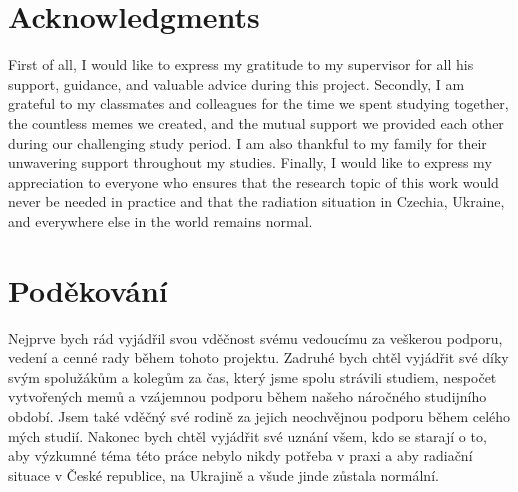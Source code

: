 
\section*{Acknowledgments}
First of all, I would like to express my gratitude to my supervisor for all his support, guidance, and valuable advice during this project.
Secondly, I am grateful to my classmates and colleagues for the time we spent studying together, the countless memes we created, and the mutual support we provided each other during our challenging study period.
I am also thankful to my family for their unwavering support throughout my studies.
Finally, I would like to express my appreciation to everyone who ensures that the research topic of this work would never be needed in practice and that the radiation situation in Czechia, Ukraine, and everywhere else in the world remains normal.

\vspace{2.5cm}








\section*{Poděkování}
Nejprve bych rád vyjádřil svou vděčnost svému vedoucímu za veškerou podporu, vedení a cenné rady během tohoto projektu. 
Zadruhé bych chtěl vyjádřit své díky svým spolužákům a kolegům za čas, který jsme spolu strávili studiem, nespočet vytvořených memů a vzájemnou podporu během našeho náročného studijního období. 
Jsem také vděčný své rodině za jejich neochvějnou podporu během celého mých studií. 
Nakonec bych chtěl vyjádřit své uznání všem, kdo se starají o to, aby výzkumné téma této práce nebylo nikdy potřeba v praxi a aby radiační situace v České republice, na Ukrajině a všude jinde zůstala normální.

